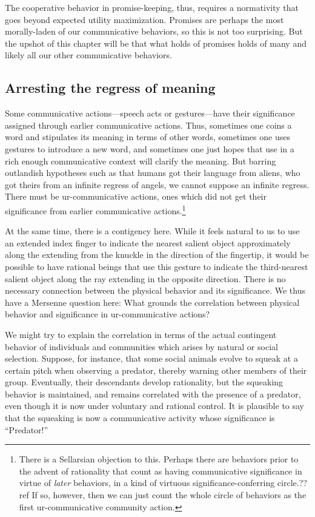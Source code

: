 The cooperative behavior in promise-keeping, thus, requires a normativity that goes beyond expected utility
maximization. Promises are perhaps the most morally-laden of our communicative behaviors, so this is not too
surprising. But the upshot of this chapter will be that what holds of promises holds of many and likely all
our other communicative behaviors. 

\subsection{Arresting the regress of meaning}
Some communicative actions---speech acts or gestures---have their significance assigned through earlier communicative 
actions. Thus, sometimes one coins a word and stipulates its meaning in terms of other words, sometimes one uses gestures
to introduce a new word, and sometimes one just hopes that use in a rich enough communicative context will clarify the
meaning. But barring outlandish hypotheses such as that humans got their language from aliens, who got theirs from an
infinite regress of angels, we cannot suppose an infinite regress. There must be ur-communicative actions, ones which did not get
their significance from earlier communicative actions.\footnote{There is a Sellarsian objection to this. Perhaps there are 
behaviors prior to the advent of rationality that count as having communicative significance in virtue of \textit{later}
behaviors, in a kind of virtuous significance-conferring circle.??ref If so, however, then we can just count the whole circle 
of behaviors as the first ur-communicative community action.}

At the same time, there is a contigency here. While it feels natural to us to use an extended index
finger to indicate the nearest salient object approximately along the  extending from the knuckle in the direction of
the fingertip, it would be possible to have rational beings that use this gesture to indicate the third-nearest salient
object along the ray extending in the opposite direction. There is no necessary connection between the
physical behavior and its significance. We thus have a Mersenne question here: What grounds the correlation between
physical behavior and significance in ur-communicative actions?

We might try to explain the correlation in terms of the actual contingent behavior of individuals and communities
which arises by natural or social selection. Suppose, for instance, that some social animals evolve to squeak at 
a certain pitch when observing a predator, thereby warning other members of their group. Eventually, their descendants
develop rationality, but the squeaking behavior is maintained, and remains correlated with the presence of a predator, even 
though it is now under voluntary and rational control. It is plausible to say that the squeaking is now a communicative
activity whose significance is ``Predator!'' 

